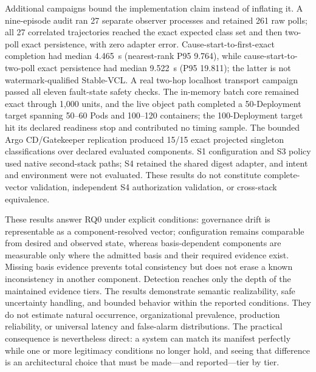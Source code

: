 Additional campaigns bound the implementation claim instead of inflating it.
A nine-episode audit ran 27 separate observer processes and retained 261 raw
polls; all 27 correlated trajectories reached the exact expected class set and
then two-poll exact persistence, with zero adapter error. Cause-start-to-first-exact
completion had median 4.465~s (nearest-rank P95 9.764), while
cause-start-to-two-poll exact persistence had median 9.522~s (P95 19.811); the
latter is not watermark-qualified Stable-VCL. A real two-hop localhost transport campaign passed
all eleven fault-state safety checks. The in-memory batch core remained exact
through 1,000 units, and the live object path completed a 50-Deployment target
spanning 50--60 Pods and 100--120 containers; the 100-Deployment target hit
its declared readiness stop and contributed no timing sample. The bounded Argo
CD/Gatekeeper replication produced 15/15 exact projected singleton
classifications over declared evaluated components. S1 configuration and S3
policy used native second-stack paths; S4 retained the shared digest adapter,
and intent and environment were not evaluated. These results do not constitute
complete-vector validation, independent S4 authorization validation, or
cross-stack equivalence.

These results answer RQ0 under explicit conditions: governance drift is
representable as a component-resolved vector; configuration remains comparable
from desired and observed state, whereas basis-dependent components are
measurable only where the admitted basis and their required evidence exist.
Missing basis evidence prevents total consistency but does not erase a known
inconsistency in another component. Detection reaches only the depth of the maintained
evidence tiers. The results demonstrate semantic realizability,
safe uncertainty handling, and bounded behavior within the reported conditions.
They do not estimate natural occurrence, organizational prevalence,
production reliability, or universal latency and false-alarm distributions.
The practical consequence is nevertheless direct: a system can match its
manifest perfectly while one or more legitimacy conditions no longer hold,
and seeing that difference is an architectural choice that must be
made---and reported---tier by tier.
